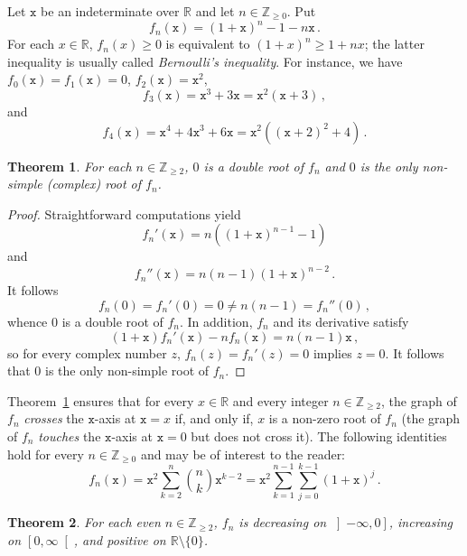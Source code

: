 \documentclass[12pt]{article}
\newcommand{\bZ}{\mathbb{Z}}
\newcommand{\bR}{\mathbb{R}}
\newcommand{\bN}[1]{\bZ_{\ge #1}}
\newcommand{\geint}[1]{\left[ #1, \infty \right[}
\newcommand{\leint}[1]{\left]- \infty, #1 \right]}
\newcommand{\ttx}{\mathtt{x}}
\newtheorem{theorem}{Theorem}
\begin{document}
\sloppy

Let $\ttx$ be an indeterminate over $\bR$ and let $n \in \bN{0}$.
Put
$$
f_n(\ttx) = {(1 + \ttx)}^n - 1 - n \ttx \, .
$$
For each $x \in \bR$, $f_n(x) \ge 0$ is equivalent to ${(1 + x)}^n \ge 1 + n x$; 
the latter inequality is usually called \emph{Bernoulli's inequality}.
For instance, we have 
$f_0(\ttx) = f_1(\ttx) = 0$,
$f_2(\ttx) = \ttx^2$,
$$
f_3(\ttx) = \ttx^3 + 3 \ttx = \ttx^2 (\ttx + 3) \,,
$$
and 
$$
f_4(\ttx) = \ttx^4 + 4 \ttx^3 + 6 \ttx = \ttx^2 \left( {(\ttx + 2)}^2 + 4 \right)  \, .
$$

\begin{theorem} \label{thm:root-mult}
  For each $n \in \bN{2}$,
  $0$ is a double root of $f_n$ and $0$ is the only non-simple (complex) root of $f_n$.
\end{theorem}

\begin{proof}
  Straightforward computations yield
  \begin{equation} \label{eq:deriv-fn} 
  f_n'(\ttx)  = n \left( {(1 + \ttx)}^{n - 1} -  1 \right) 
  \end{equation}
  and
  $$
  f_n''(\ttx)  = n (n - 1) {(1 + \ttx)}^{n - 2} \,.
  $$
  It follows
  $$
  f_n(0) = f_n'(0) = 0 \ne n (n - 1) = f_n''(0) \, ,
  $$
  whence $0$ is a double root of $f_n$.
  In addition, $f_n$ and its derivative satisfy 
   $$
   (1 + \ttx) f_n'(\ttx) - n f_n(\ttx) = n (n - 1) \ttx \, ,
   $$
   so for every complex number $z$, $f_n(z) = f_n'(z) = 0$ implies $z = 0$.
   It follows that $0$ is the only non-simple root of $f_n$.
 \end{proof}
 
Theorem~\ref{thm:root-mult} ensures that for every $x \in \bR$ and every integer $n \in \bN{2}$,
the graph of $f_n$ \emph{crosses} the $\ttx$-axis at $\ttx = x$ if, and only if, $x$ is a non-zero root of $f_n$
(the graph of $f_n$ \emph{touches} the $\ttx$-axis at $\ttx = 0$ but does not cross it).
 The following identities hold for every $n \in \bN{0}$ and may be of interest to the reader:
 $$
 f_n (\ttx)
 = \ttx^2 \sum_{k = 2}^n \binom{n}{k} \ttx^{k - 2}
 = \ttx^2 \sum_{k = 1}^{n - 1}  \sum_{j = 0}^{k - 1} {(1 + \ttx)}^j \, .  
 $$



 \begin{theorem} \label{thm:n-is-even}
   For each even  $n \in \bN{2}$,
   $f_n$ is
   decreasing on $\leint{0}$,
   increasing on $\geint{0}$, and
   positive on $\bR \setminus \{ 0 \}$.
 \end{theorem}
\end{document}

